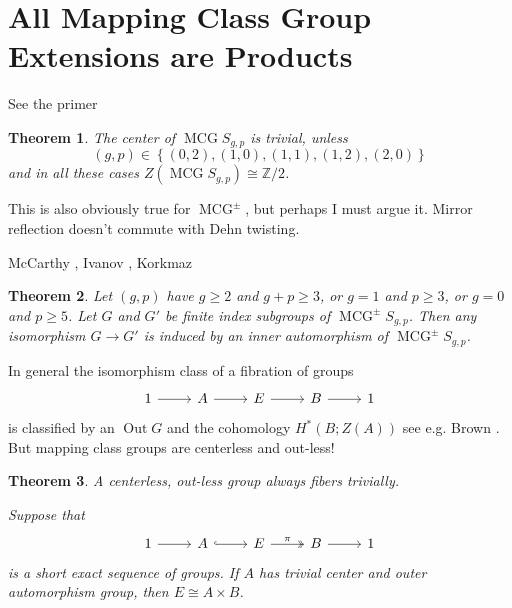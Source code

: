 \documentclass[11pt]{article}
\newcommand{\Z}{\mathbb{Z}}
\DeclareMathOperator{\oout}{Out}
\DeclareMathOperator{\mcg}{MCG}
\newtheorem{theorem}{Theorem}
\theoremstyle{remark}
\theoremstyle{definition}
\begin{document}
\section{All Mapping Class Group Extensions are Products}

See the primer \cite{primer}
\begin{theorem}
  The center of $\mcg S_{g,p}$ is trivial, unless
  $$(g,p) \in \left\{ (0,2), (1,0),(1,1),(1,2),(2,0) \right\}$$
  and in all these cases $Z\left ( \mcg S_{g,p} \right ) \cong \Z/2$.
  \label{nocenter}
\end{theorem}

This is also obviously true for $\mcg^{\pm}$,
but perhaps I must argue it.
Mirror reflection doesn't commute with Dehn twisting.

McCarthy \cite{MR830038},
Ivanov \cite{MR1460387},
Korkmaz \cite{MR1696431}
\begin{theorem}
Let $(g,p)$ have $g\geq 2$ and $g+p \geq 3$,
or $g=1$ and $p\geq 3$, or $g=0$ and $p \geq 5$.
Let $G$ and $G'$ be finite index subgroups of $\mcg^\pm S_{g,p}$.
Then any isomorphism $G\to G'$ is induced by an inner automorphism of $\mcg^\pm S_{g,p}$.
\label{outmod}
\end{theorem}

In general the isomorphism class of a fibration of groups
$$
\begin{tikzcd}
  1 \arrow[r] &
  A \arrow[r]&
  E \arrow[r]&
  B \arrow[r]&
  1
\end{tikzcd}
$$
is classified by an $\oout G$ and
the cohomology $H^\ast (B;Z(A))$
see e.g. Brown \cite{MR1324339}.
But mapping class groups are centerless and out-less!

\begin{theorem}
  A centerless, out-less group always fibers trivially.

  Suppose that
  $$
  \begin{tikzcd}
    1 \arrow[r] &
    A \arrow[hook,r]&
    E \arrow[two heads]{r}{\pi}&
    B \arrow[r]&
    1
  \end{tikzcd}
  $$
  is a short exact sequence of groups.
  If $A$ has trivial center and outer automorphism group,
  then $E \cong A \times B$.
\end{theorem}
\end{document}
